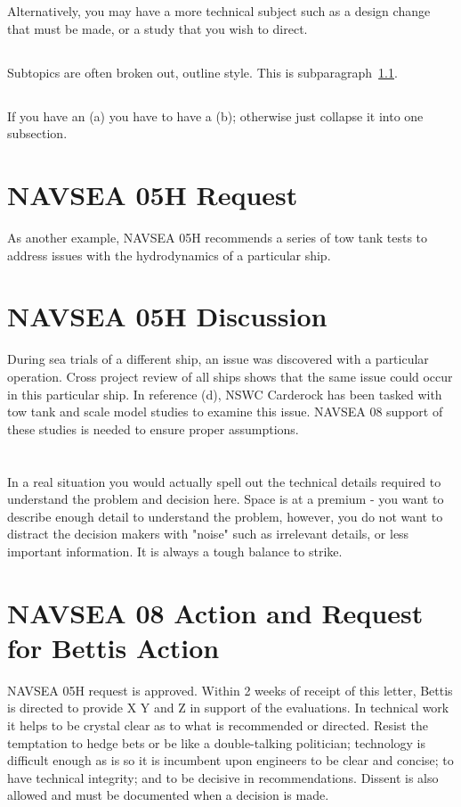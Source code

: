\documentclass[12pt,courier]{navyletter}
\begin{document}
\section{} Alternatively, you may have a more technical subject such as a design change that must be made, or a study that you wish to direct.  

\subsection{}\label{test2} Subtopics are often broken out, outline style. This is subparagraph~\ref{test2}.

\subsection{} If you have an (a) you have to have a (b); otherwise just collapse it into one subsection.

\section{NAVSEA 05H Request} As another example, NAVSEA 05H recommends a series of tow tank tests to address issues with the hydrodynamics of a particular ship.

\section{NAVSEA 05H Discussion} During sea trials of a different ship, an issue was discovered with a particular operation. Cross project review of all ships shows that the same issue could occur in this particular ship.  In reference (d), NSWC Carderock has been tasked with tow tank and scale model studies to examine this issue.  NAVSEA 08 support of these studies is needed to ensure proper assumptions.

\section{} In a real situation you would actually spell out the technical details required to understand the problem and decision here.  Space is at a premium - you want to describe enough detail to understand the problem, however, you do not want to distract the decision makers with "noise" such as irrelevant details, or less important information.  It is always a tough balance to strike. 

\section{NAVSEA 08 Action and Request for Bettis Action}  NAVSEA 05H request is approved. Within 2 weeks of receipt of this letter, Bettis is directed to provide X Y and Z in support of the evaluations. In technical work it helps to be crystal clear as to what is recommended or directed. Resist the temptation to hedge bets or be like a double-talking politician; technology is difficult enough as is so it is incumbent upon engineers to be clear and concise; to have technical integrity; and to be decisive in recommendations.  Dissent is also allowed and must be documented when a decision is made. 
\end{document}
